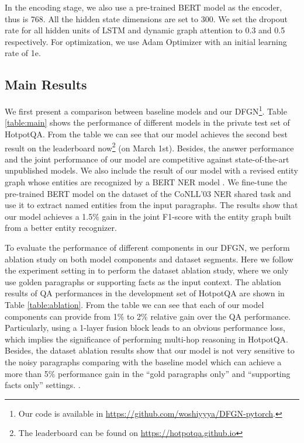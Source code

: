 \documentclass[11pt,a4paper]{article}
\begin{document}
In the encoding stage, we also use a pre-trained BERT model as the encoder, thus  is 768. All the hidden state dimensions  are set to 300. We set the dropout rate for all hidden units of LSTM and dynamic graph attention to 0.3 and 0.5 respectively. For optimization, we use Adam Optimizer \cite{kingma2014adam} with an initial learning rate of 1e.



\subsection{Main Results}
We first present a comparison between baseline models and our DFGN\footnote{Our code is available in \url{https://github.com/woshiyyya/DFGN-pytorch}.}. Table \ref{table:main} shows the performance of different models in the private test set of HotpotQA. From the table we can see that our model achieves the second best result on the leaderboard now\footnote{The leaderboard can be found on \url{https://hotpotqa.github.io}} (on March 1st). Besides, the answer performance and the joint performance of our model are competitive against state-of-the-art unpublished models.
We also include the result of our model with a revised entity graph whose entities are recognized by a BERT NER model \cite{devlin2018bert}.
We fine-tune the pre-trained BERT model on the dataset of the CoNLL'03 NER shared task \cite{sang2003introduction} and use it to extract named entities from the input paragraphs.
The results show that our model achieves a 1.5\% gain in the joint F1-score with the entity graph built from a better entity recognizer.

To evaluate the performance of different components in our DFGN, we perform ablation study on both model components and dataset segments. Here we follow the experiment setting in  to perform the dataset ablation study, where we only use golden paragraphs or supporting facts as the input context. The ablation results of QA performances in the development set of HotpotQA are shown in Table \ref{table:ablation}. From the table we can see that each of our model components can provide from 1\% to 2\% relative gain over the QA performance. 
Particularly, using a 1-layer fusion block leads to an obvious performance loss, which implies the significance of performing multi-hop reasoning in HotpotQA. Besides, the dataset ablation results show that our model is not very sensitive to the noisy paragraphs comparing with the baseline model which can achieve a more than 5\% performance gain in the ``gold paragraphs only'' and ``supporting facts only'' settings. \cite{yang2018hotpotqa}.
\end{document}
